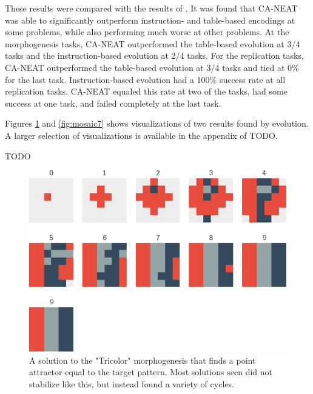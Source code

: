 These results were compared with the results of \cite{nichele2014evolutionary}.
It was found that CA-NEAT was able to significantly outperform instruction- and table-based encodings at some problems, while also performing much worse at other problems.
At the morphogenesis tasks, CA-NEAT outperformed the table-based evolution at 3/4 tasks and the instruction-based evolution at 2/4 tasks.
For the replication tasks, CA-NEAT outperformed the table-based evolution at 3/4 tasks and tied at 0\% for the last task.
Instruction-based evolution had a 100\% success rate at all replication tasks.
CA-NEAT equaled this rate at two of the tasks, had some success at one task, and failed completely at the last task.

Figures \ref{fig:tricolor_point_attractor} and \ref{fig:mosaic7} shows visualizations of two results found by evolution.
A larger selection of visualizations is available in the appendix of TODO.

TODO

\begin{figure}
\centering
\includegraphics[width=\textwidth, keepaspectratio]{fig/result_figs/generate_tricolor/1}
\caption[A solution to the "Tricolor" morphogenesis]{A solution to the "Tricolor" morphogenesis that finds a point attractor equal to the target pattern.
Most solutions seen did not stabilize like this, but instead found a variety of cycles.}
\label{fig:tricolor_point_attractor}
\end{figure}

